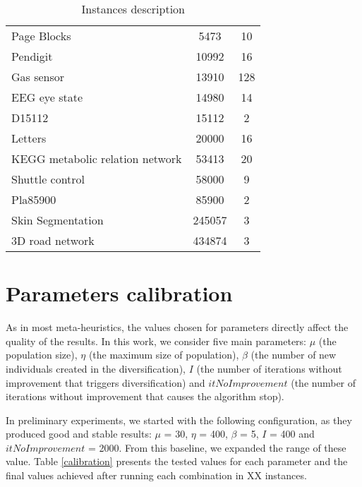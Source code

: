 \begin{table}[]
\begin{tabular}{@{}lcc@{}}
Page Blocks                     & 5473                  & 10                 \\
Pendigit                        & 10992                 & 16                 \\
Gas sensor                      & 13910                 & 128                \\
EEG eye state                   & 14980                 & 14                 \\
D15112                          & 15112                 & 2                  \\
Letters                         & 20000                 & 16                 \\
KEGG metabolic relation network & 53413                 & 20                 \\
Shuttle control                 & 58000                 & 9                  \\
Pla85900                        & 85900                 & 2                  \\
Skin Segmentation               & 245057                & 3                  \\
3D road network                 & 434874                & 3                  \\ \bottomrule
\end{tabular}
\caption{Instances description}
\label{instances}
\end{table}

\section{Parameters calibration}
As in most meta-heuristics, the values chosen for parameters directly affect the quality of the results. In this work, we consider five main parameters: $\mu$ (the population size), $\eta$ (the maximum size of population), $\beta$ (the number of new individuals created in the diversification), $I$ (the number of iterations without improvement that triggers diversification) and $itNoImprovement$ (the number of iterations without improvement that causes the algorithm stop).

In preliminary experiments, we started with the following configuration, as they produced good and stable results: $\mu$ = 30, $\eta$ = 400, $\beta$ = 5, $I$ = 400 and $itNoImprovement$ = 2000. From this baseline, we expanded the range of these value. Table \ref{calibration} presents the tested values for each parameter and the final values achieved after running each combination in XX instances.

